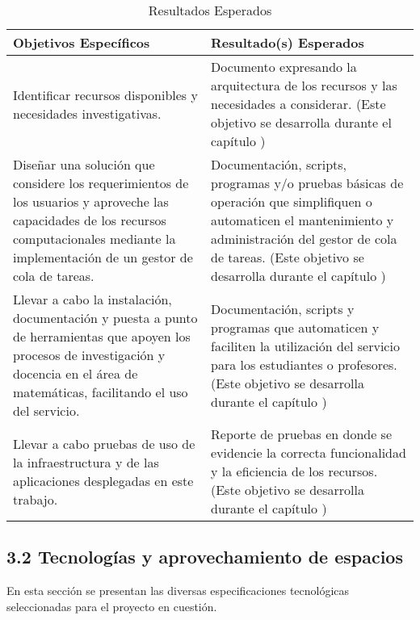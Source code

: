 \begin{spacing}{1.5}
  \begin{table}[h]
    \centering
    \begin{tabular}{p{7cm}|p{7cm}}
      \hline
      \textbf{Objetivos Específicos}                                 & \textbf{Resultado(s) Esperados}                                          \\
      \hline
      Identificar recursos disponibles y necesidades investigativas. &
      Documento expresando la arquitectura de los recursos y las necesidades a
      considerar. (Este objetivo se desarrolla durante el capítulo \nameref{chap:recursos-necesidades})                                         \\
      \hline
      Diseñar una solución que considere los requerimientos de los usuarios y
      aproveche las capacidades de los recursos computacionales mediante la
      implementación de un gestor de cola de tareas.                 & Documentación, scripts,
      programas y/o pruebas básicas de operación que simplifiquen o automaticen el
      mantenimiento y administración del gestor de cola de tareas.       (Este objetivo se desarrolla durante el capítulo \nameref{chap:3.2})   \\
      \hline
      Llevar a cabo la instalación, documentación y puesta a punto de
      herramientas que apoyen los procesos de investigación y docencia en el área de
      matemáticas, facilitando el uso del servicio.                  & Documentación, scripts y
      programas que automaticen y faciliten la utilización del servicio para los
      estudiantes o profesores. (Este objetivo se desarrolla durante el capítulo \nameref{chap:4.3})                                            \\
      \hline
      Llevar a cabo pruebas de uso de la infraestructura y de las
      aplicaciones desplegadas en este trabajo.                      & Reporte de pruebas en donde se
      evidencie la correcta funcionalidad y la eficiencia de los recursos. (Este objetivo se desarrolla durante el capítulo \nameref{chap:4.4}) \\
      \hline
    \end{tabular}
    \caption{Resultados Esperados}
    \label{table:table2}
  \end{table}

  \subsection{3.2 Tecnologías y aprovechamiento de espacios}
  \label{chap:3.2}
  En esta sección se presentan las diversas especificaciones tecnológicas
  seleccionadas para el proyecto en cuestión.


\end{spacing}
